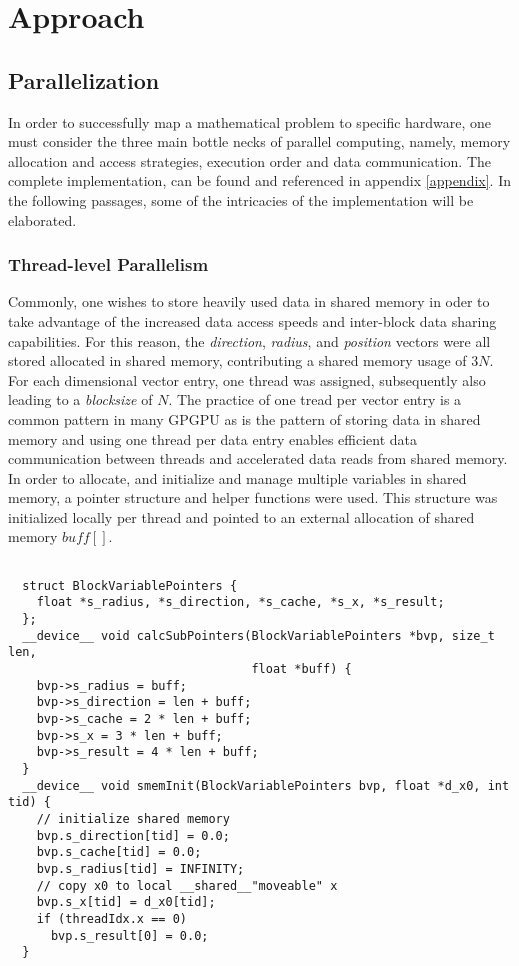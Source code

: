 \chapter{Approach}
\label{chapter:approach}
\section{Parallelization}
In order to successfully map a mathematical problem to specific hardware, one must
consider the three main bottle necks of parallel computing, namely,
memory allocation and access strategies, execution order and data communication.
The complete implementation, can be found and referenced in appendix \ref{appendix}.
In the following passages, some of the intricacies of the implementation will be
elaborated.

\subsection{Thread-level Parallelism}\label{tlp}
Commonly, one wishes to store heavily used data in shared memory in oder to
take advantage of the increased data access speeds and inter-block data sharing
capabilities.  For this reason, the \textit{direction}, \textit{radius}, and \textit{position}
vectors were all stored allocated in shared memory, contributing a shared memory usage of%
$3N$.  For each dimensional vector entry, one thread was assigned, subsequently
also leading to a \textit{blocksize} of $N$.  The practice of one tread per vector
entry is a common pattern in many \Gls{GPGPU} as is the pattern of storing data in shared
memory and using one thread per data entry enables efficient data communication
between threads and accelerated data reads from shared memory. In order to allocate,
and initialize and manage multiple variables in shared memory, a pointer structure and helper functions
were used.  This structure was initialized locally per thread and pointed to an
external allocation of shared memory $buff[ ]$.

\begin{lstlisting}[caption="src/wos\_native.cuh",label=BlockVariablePointers]

  struct BlockVariablePointers {
    float *s_radius, *s_direction, *s_cache, *s_x, *s_result;
  };
  __device__ void calcSubPointers(BlockVariablePointers *bvp, size_t len,
                                  float *buff) {
    bvp->s_radius = buff;
    bvp->s_direction = len + buff;
    bvp->s_cache = 2 * len + buff;
    bvp->s_x = 3 * len + buff;
    bvp->s_result = 4 * len + buff;
  }
  __device__ void smemInit(BlockVariablePointers bvp, float *d_x0, int tid) {
    // initialize shared memory
    bvp.s_direction[tid] = 0.0;
    bvp.s_cache[tid] = 0.0;
    bvp.s_radius[tid] = INFINITY;
    // copy x0 to local __shared__"moveable" x
    bvp.s_x[tid] = d_x0[tid];
    if (threadIdx.x == 0)
      bvp.s_result[0] = 0.0;
  }
\end{lstlisting}

